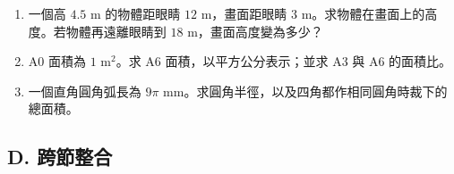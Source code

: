 \documentclass[11pt,a4paper]{article}
\begin{document}
\begin{enumerate}
\def\labelenumi{\arabic{enumi}.}
\setcounter{enumi}{9}
\item
  一個高 \(4.5\text{ m}\) 的物體距眼睛 \(12\text{ m}\)，畫面距眼睛 \(3\text{ m}\)。求物體在畫面上的高度。若物體再遠離眼睛到 \(18\text{ m}\)，畫面高度變為多少？
\item
  A0 面積為 \(1\text{ m}^2\)。求 A6 面積，以平方公分表示；並求 A3 與 A6 的面積比。
\item
  一個直角圓角弧長為 \(9\pi\text{ mm}\)。求圓角半徑，以及四角都作相同圓角時裁下的總面積。
\end{enumerate}

\subsection{D. 跨節整合}\label{d.-ux8de8ux7bc0ux6574ux5408}
\end{document}
